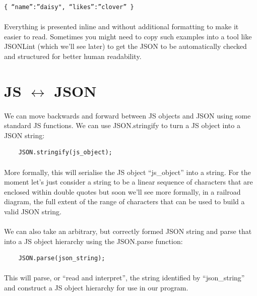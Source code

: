 \begin{lstlisting}
{ “name”:”daisy", “likes”:”clover” }
\end{lstlisting}

\paragraph{} Everything is presented inline and without additional formatting to make it easier to read. Sometimes you might need to copy such examples into a tool like JSONLint (which we'll see later) to get the JSON to be automatically checked and structured for better human readability.



\section{JS $\longleftrightarrow$ JSON}
\paragraph{} We can move backwards and forward between JS objects and JSON using some standard JS functions. We can use JSON.stringify to turn a JS object into a JSON string:

\begin{lstlisting}
	JSON.stringify(js_object);
\end{lstlisting}

\paragraph{} More formally, this will serialise the JS object ``js\_object'' into a string. For the moment let's just consider a string to be a linear sequence of characters that are enclosed within double quotes but soon we'll see more formally, in a railroad diagram, the full extent of the range of characters that can be used to build a valid JSON string.

\paragraph{} We can also take an arbitrary, but correctly formed JSON string and parse that into a JS object hierarchy using the JSON.parse function:

\begin{lstlisting}
	JSON.parse(json_string);
\end{lstlisting}

\paragraph{} This will parse, or ``read and interpret'', the string identified by ``json\_string'' and construct a JS object hierarchy for use in our program.

